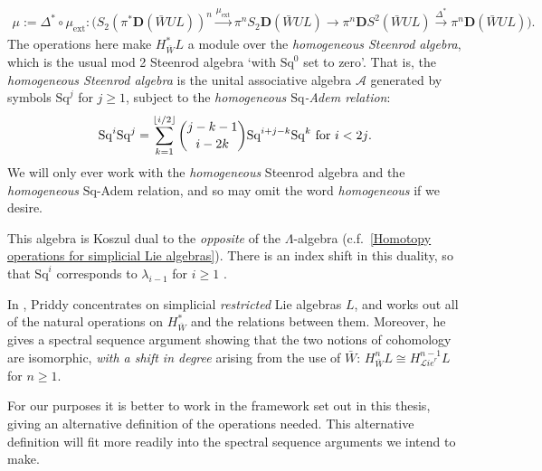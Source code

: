 \documentclass[11pt]{amsart} \renewcommand{\baselinestretch}{1.2}
\theoremstyle{plain}
\numberwithin{equation}{section} %
\theoremstyle{plain}
\numberwithin{equation}{chapter} %
\renewcommand{\to}{\longrightarrow}
\newcommand{\scrL}{\mathscr{L}}
\newcommand{\calA}{\mathcal{A}}
\newcommand{\citeBOX}[2][]{\cite[\mbox{#1}]{#2}}
\newcommand{\ExtCohProd}{\mu_\mathrm{ext}}
\newcommand{\Sq}{\mathrm{Sq}}
\newcommand{\LieSteen}{\calA}
\newcommand{\restliealgs}{{\scrL\!\textit{ie}^\textit{r}}}
\newcommand{\dual}{\mathbf{D}}
\begin{document}
\begin{Constructing cohomology operations}
\begin{gather*}
\mu:=\Delta^*\circ\ExtCohProd:\bigl(S_2(\pi^*\dual(\bar{W}UL))^{n}\overset{\ExtCohProd}{\to} \pi^nS_2\dual(\bar{W}UL)\to \pi^n\dual S^2(\bar{W}UL)\overset{\Delta^*}{\to}\pi^n\dual (\bar{W}UL)\bigr).
\end{gather*}
The operations here make $H^*_{\bar{W}}L$ a module over the \emph{homogeneous Steenrod algebra}, which is the usual mod 2 Steenrod algebra `with $\Sq^0$ set to zero'. That is, the \emph{homogeneous Steenrod algebra} is the unital associative algebra $\LieSteen$ generated by symbols $\Sq^j$ for $j\geq1$, subject to the \emph{homogeneous $\Sq$-Adem relation}:
\[\Sq^i\Sq^j=\sum_{k=1}^{\lfloor i/2\rfloor}\binom{j-k-1}{ i-2k}\Sq^{i+j-k}\Sq^k\textup{\ for $i<2j$.}\]
We will only ever work with the \emph{homogeneous} Steenrod algebra and the \emph{homogeneous} $\Sq$-Adem relation, and so may omit the word \emph{homogeneous} if we desire.

This algebra is Koszul dual to the \emph{opposite} of the $\Lambda$-algebra (c.f.\ \ref{Homotopy operations for simplicial Lie algebras}). There is an index shift in this duality, so that $\Sq^i$ corresponds to $\lambda_{i-1}$ for $i\geq1$ \citeBOX[\S7.1]{PriddyKoszul.pdf}.

In \cite{PriddySimplicialLie.pdf}, Priddy concentrates on simplicial \emph{restricted} Lie algebras $L$, and works out all of the natural operations on $H^*_{\bar{W}}$ and the relations between them. Moreover, he gives a spectral sequence argument showing that the two notions of cohomology are isomorphic, \emph{with a shift in degree} arising from the use of $\bar{W}$: $H_{\bar{W}}^nL\cong H^{n-1}_{\restliealgs}L$ for $n\geq1$.

For our purposes it is better to work in the framework set out in this thesis, giving an alternative definition of the operations needed. This alternative definition will fit more readily into the spectral sequence arguments we intend to make. 


\end{Constructing cohomology operations}
\end{document}

